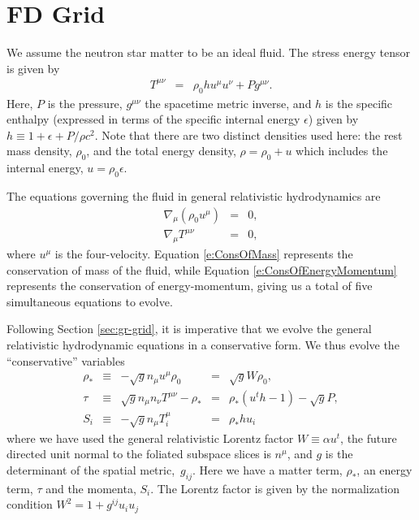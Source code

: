 \section{FD Grid}
\label{sec:fd-grid}

We assume the neutron star matter to be an ideal fluid.  The stress energy tensor is given by
\begin{eqnarray}
T^{\mu \nu} &=& \rho_0 h u^\mu u^\nu + P g^{\mu \nu}.
\label{e:StressEnergyTensor}
\end{eqnarray}
Here, $P$ is the pressure, $g^{\mu \nu}$ the spacetime metric inverse, and $h$ is the specific enthalpy (expressed in terms of the specific internal energy $\epsilon$) given by $h \equiv 1 + \epsilon + P/{\rho c^2}$.
Note that there are two distinct densities used here: the rest mass density, $\rho_0$, and the total energy density, $\rho = \rho_0 + u$ which includes the internal energy, $u = \rho_0 \epsilon$.

The equations governing the fluid in general relativistic hydrodynamics are
\begin{eqnarray}
\nabla_\mu \left( \rho_0 u^\mu \right) &=& 0, \label{e:ConsOfMass} \\
\nabla_\mu T^{\mu \nu} &=& 0, \label{e:ConsOfEnergyMomentum}
\end{eqnarray}
where $u^\mu$ is the four-velocity.  Equation \ref{e:ConsOfMass} represents the conservation of mass of the fluid, while Equation \ref{e:ConsOfEnergyMomentum} represents the conservation of energy-momentum, giving us a total of five simultaneous equations to evolve. 

Following Section \ref{sec:gr-grid}, it is imperative that we evolve the general relativistic hydrodynamic equations in a conservative form.  We thus evolve the ``conservative'' variables
\begin{align}
\label{e:RhoStar}
\rho_*	&\equiv& -\sqrt{g} n_\mu u^\mu \rho_0 
		&=& \sqrt{g} W \rho_0, \\
\label{e:Tau}
\tau 	&\equiv& \sqrt{g} n_\mu n_\nu T^{\mu\nu} - \rho_* 
		&=& \rho_* \left(u^t h - 1\right) - \sqrt{g} P, \\
\label{e:Sflux}
S_i  	&\equiv& -\sqrt{g} n_\mu T^\mu_i 
		&=& \rho_* h u_i
\end{align}
where we have used the general relativistic Lorentz factor $W \equiv \alpha u^t$, the future directed unit normal to the foliated subspace slices is $n^\mu$, and $g$ is the determinant of the spatial \mbox{metric, $g_{ij}$}.  Here we have a matter term, $\rho_*$, an energy term, $\tau$ and the momenta, $S_i$.  The Lorentz factor is given by the normalization condition $W^2 = 1 + g^{ij} u_i u_j$

